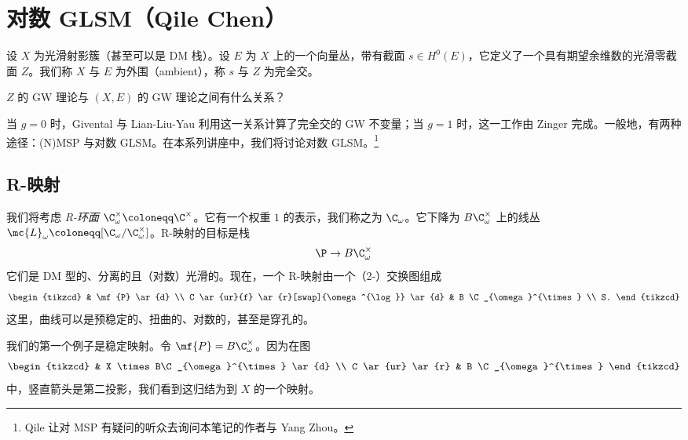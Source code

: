 \section{对数 GLSM（Qile Chen）}%
\label{sec:Log GLSM (Qile Chen)}

设 \(X\) 为光滑射影簇（甚至可以是 DM 栈）。设 \(E\) 为 \(X\) 上的一个向量丛，带有截面 \(s \in H^0(E)\)，它定义了一个具有期望余维数的光滑零截面 \(Z\)。我们称 \(X\) 与 \(E\) 为外围（ambient），称 \(s\) 与 \(Z\) 为完全交。

\begin{quest}
    \(Z\) 的 GW 理论与 \((X, E)\) 的 GW 理论之间有什么关系？
\end{quest}

当 \(g = 0\) 时，Givental 与 Lian-Liu-Yau 利用这一关系计算了完全交的 GW 不变量；当 \(g = 1\) 时，这一工作由 Zinger 完成。一般地，有两种途径：(N)MSP 与对数 GLSM。在本系列讲座中，我们将讨论对数 GLSM。\footnote{Qile 让对 MSP 有疑问的听众去询问本笔记的作者与 Yang Zhou。}

\subsection{R-映射}%
\label{sub:R-maps}

我们将考虑 \textit{R-环面} \(\C^{\times}_{\omega} \coloneqq \C^{\times}\)。它有一个权重 \(1\) 的表示，我们称之为 \(\C_{\omega}\)。它下降为 \(B \C_{\omega}^{\times}\) 上的线丛 \(\mc{L}_{\omega} \coloneqq [\C_{\omega} / \C^{\times}_{\omega}]\)。R-映射的目标是栈
\[ \P \to B \C^{\times}_{\omega} \]
它们是 DM 型的、分离的且（对数）光滑的。现在，一个 R-映射由一个（2-）交换图组成
\begin{equation*}
\begin{tikzcd}
    & \mf{P} \ar{d} \\
    C \ar{ur}{f} \ar{r}[swap]{\omega^{\log}} \ar{d} & B \C_{\omega}^{\times} \\
    S.
\end{tikzcd}
\end{equation*}
这里，曲线可以是预稳定的、扭曲的、对数的，甚至是穿孔的。

\begin{exm}
    我们的第一个例子是稳定映射。令 \(\mf{P} = B\C_{\omega}^{\times}\)。因为在图
    \begin{equation*}
    \begin{tikzcd}
        & X \times B\C_{\omega}^{\times} \ar{d} \\
        C \ar{ur} \ar{r} & B \C_{\omega}^{\times}
    \end{tikzcd}
    \end{equation*}
    中，竖直箭头是第二投影，我们看到这归结为到 \(X\) 的一个映射。
\end{exm}

